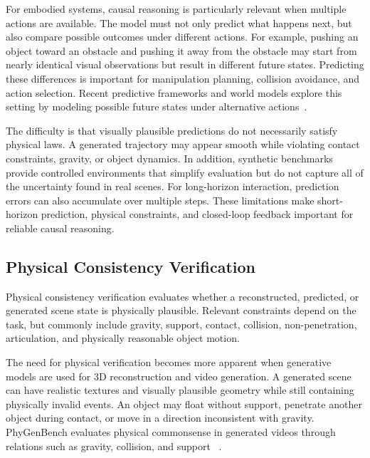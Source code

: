\documentclass{SCIS2026}
\begin{document}
For embodied systems, causal reasoning is particularly relevant when
multiple actions are available. The model must not only predict what happens
next, but also compare possible outcomes under different actions. For
example, pushing an object toward an obstacle and pushing it away from the
obstacle may start from nearly identical visual observations but result in
different future states. Predicting these differences is important for
manipulation planning, collision avoidance, and action selection. Recent
predictive frameworks and world models explore this setting by modeling
possible future states under alternative actions~\cite{wang2026autonomous}.

The difficulty is that visually plausible predictions do not necessarily
satisfy physical laws. A generated trajectory may appear smooth while
violating contact constraints, gravity, or object dynamics. In addition,
synthetic benchmarks provide controlled environments that simplify
evaluation but do not capture all of the uncertainty found in real scenes.
For long-horizon interaction, prediction errors can also accumulate over
multiple steps. These limitations make short-horizon prediction, physical
constraints, and closed-loop feedback important for reliable causal
reasoning.



\subsection{Physical Consistency Verification}

Physical consistency verification evaluates whether a reconstructed,
predicted, or generated scene state is physically plausible. Relevant
constraints depend on the task, but commonly include gravity, support,
contact, collision, non-penetration, articulation, and physically reasonable
object motion.

The need for physical verification becomes more apparent when generative
models are used for 3D reconstruction and video generation. A generated
scene can have realistic textures and visually plausible geometry while
still containing physically invalid events. An object may float without
support, penetrate another object during contact, or move in a direction
inconsistent with gravity. PhyGenBench evaluates physical commonsense in
generated videos through relations such as gravity, collision, and support
~\cite{meng2024towards}.
\end{document}
